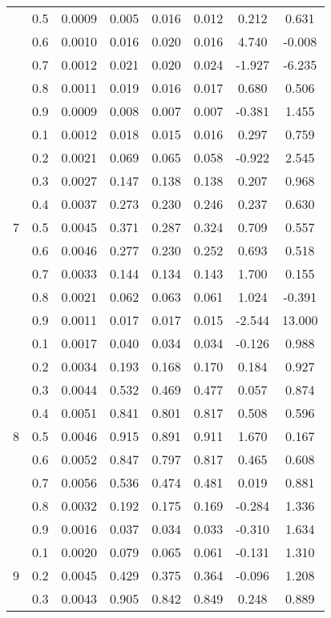 \documentclass[11pt,a4paper]{report}
\begin{document}
\begin{longtable}{ | c | c || c | c | c | c | c | c | }
 & 0.5 & 0.0009 & 0.005 & 0.016 & 0.012 & 0.212 & 0.631 \\
 & 0.6 & 0.0010 & 0.016 & 0.020 & 0.016 & 4.740 & -0.008 \\
 & 0.7 & 0.0012 & 0.021 & 0.020 & 0.024 & -1.927 & -6.235 \\
 & 0.8 & 0.0011 & 0.019 & 0.016 & 0.017 & 0.680 & 0.506 \\
 & 0.9 & 0.0009 & 0.008 & 0.007 & 0.007 & -0.381 & 1.455 \\
 \hline
\multirow{9}{*}{7} & 0.1 & 0.0012 & 0.018 & 0.015 & 0.016 & 0.297 & 0.759 \\
 & 0.2 & 0.0021 & 0.069 & 0.065 & 0.058 & -0.922 & 2.545 \\
 & 0.3 & 0.0027 & 0.147 & 0.138 & 0.138 & 0.207 & 0.968 \\
 & 0.4 & 0.0037 & 0.273 & 0.230 & 0.246 & 0.237 & 0.630 \\
 & 0.5 & 0.0045 & 0.371 & 0.287 & 0.324 & 0.709 & 0.557 \\
 & 0.6 & 0.0046 & 0.277 & 0.230 & 0.252 & 0.693 & 0.518 \\
 & 0.7 & 0.0033 & 0.144 & 0.134 & 0.143 & 1.700 & 0.155 \\
 & 0.8 & 0.0021 & 0.062 & 0.063 & 0.061 & 1.024 & -0.391 \\
 & 0.9 & 0.0011 & 0.017 & 0.017 & 0.015 & -2.544 & 13.000 \\
 \hline
\multirow{9}{*}{8} & 0.1 & 0.0017 & 0.040 & 0.034 & 0.034 & -0.126 & 0.988 \\
 & 0.2 & 0.0034 & 0.193 & 0.168 & 0.170 & 0.184 & 0.927 \\
 & 0.3 & 0.0044 & 0.532 & 0.469 & 0.477 & 0.057 & 0.874 \\
 & 0.4 & 0.0051 & 0.841 & 0.801 & 0.817 & 0.508 & 0.596 \\
 & 0.5 & 0.0046 & 0.915 & 0.891 & 0.911 & 1.670 & 0.167 \\
 & 0.6 & 0.0052 & 0.847 & 0.797 & 0.817 & 0.465 & 0.608 \\
 & 0.7 & 0.0056 & 0.536 & 0.474 & 0.481 & 0.019 & 0.881 \\
 & 0.8 & 0.0032 & 0.192 & 0.175 & 0.169 & -0.284 & 1.336 \\
 & 0.9 & 0.0016 & 0.037 & 0.034 & 0.033 & -0.310 & 1.634 \\
 \hline
\multirow{9}{*}{9} & 0.1 & 0.0020 & 0.079 & 0.065 & 0.061 & -0.131 & 1.310 \\
 & 0.2 & 0.0045 & 0.429 & 0.375 & 0.364 & -0.096 & 1.208 \\
 & 0.3 & 0.0043 & 0.905 & 0.842 & 0.849 & 0.248 & 0.889 \\

\end{longtable}
\end{document}
